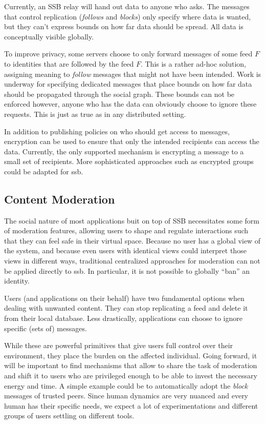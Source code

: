 \documentclass[10pt,sigconf]{acmart}
\begin{document}
Currently, an SSB relay will hand out data to anyone who asks. The messages that control replication (\textit{follows} and \textit{blocks}) only specify where data is wanted, but they can't express bounds on how far data should be spread. All data is conceptually visible globally.

To improve privacy, some servers choose to only forward messages of some feed $F$ to identities that are followed by the feed $F$. This is a rather ad-hoc solution, assigning meaning to \textit{follow} messages that might not have been intended. Work is underway for specifying dedicated messages that place bounds on how far data should be propagated through the social graph. These bounds can not be enforced however, anyone who has the data can obviously choose to ignore these requests. This is just as true as in any distributed setting.

In addition to publishing policies on who should get access to messages, encryption can be used to ensure that only the intended recipients can access the data. Currently, the only supported mechanism is encrypting a message to a small set of recipients. More sophisticated approaches such as encrypted groups could be adapted for ssb.

\subsection{Content Moderation}

The social nature of most applications buit on top of SSB necessitates some form of moderation features, allowing users to shape and regulate interactions such that they can feel safe in their virtual space. Because no user has a global view of the system, and because even users with identical views could interpret those views in different ways, traditional centralized approaches for moderation can not be applied directly to ssb. In particular, it is not possible to globally ``ban'' an identity.

Users (and applications on their behalf) have two fundamental options when dealing with unwanted content. They can stop replicating a feed and delete it from their local database. Less drastically, applications can choose to ignore specific (sets of) messages.

While these are powerful primitives that give users full control over their environment, they place the burden on the affected individual. Going forward, it will be important to find mechanisms that allow to share the task of moderation and shift it to users who are privileged enough to be able to invest the necessary energy and time. A simple example could be to automatically adopt the \textit{block} messages of trusted peers. Since human dynamics are very nuanced and every human has their specific needs, we expect a lot of experimentations and different groups of users settling on different tools.
\end{document}
